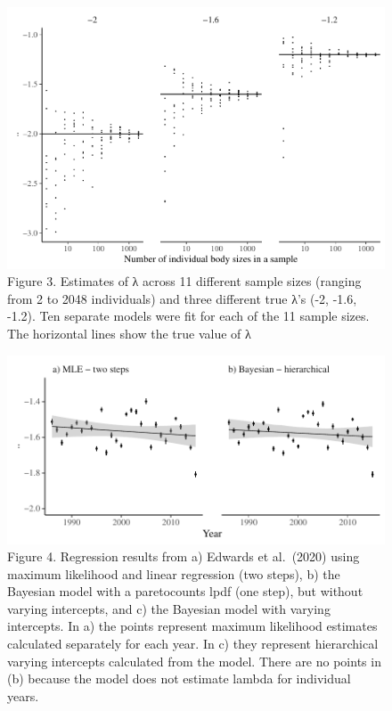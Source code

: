 \documentclass[
  12pt,
]{article}
\numberwithin{equation}
\begin{document}
\begin{figure}
\centering
\includegraphics{stan_spectra_manuscript_update_files/figure-latex/unnamed-chunk-5-1.pdf}
\caption{Figure 3. Estimates of λ across 11 different sample sizes
(ranging from 2 to 2048 individuals) and three different true λ's (-2,
-1.6, -1.2). Ten separate models were fit for each of the 11 sample
sizes. The horizontal lines show the true value of λ}
\end{figure}

\begin{figure}
\centering
\includegraphics{stan_spectra_manuscript_update_files/figure-latex/unnamed-chunk-6-1.pdf}
\caption{Figure 4. Regression results from a) Edwards et al.~(2020)
using maximum likelihood and linear regression (two steps), b) the
Bayesian model with a paretocounts lpdf (one step), but without varying
intercepts, and c) the Bayesian model with varying intercepts. In a) the
points represent maximum likelihood estimates calculated separately for
each year. In c) they represent hierarchical varying intercepts
calculated from the model. There are no points in (b) because the model
does not estimate lambda for individual years.}
\end{figure}

\hypertarget{section}{%
\section{}\label{section}}
\end{document}
